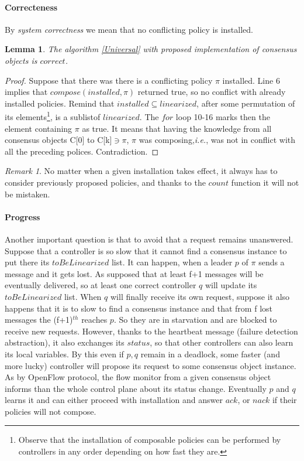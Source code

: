 \documentclass{article}
\newtheorem{lemma}{Lemma}
\theoremstyle{remark}
\newtheorem*{remark}{Remark}
\begin{document}
\paragraph{Correcteness} 
By \emph{system correctness} we mean that no conflicting policy is installed.
\begin{lemma}\label{Correctness}
The algorithm \ref{Universal} with proposed implementation of consensus objects is $correct$. 
\end{lemma}
\begin{proof}
Suppose that there was there is a conflicting policy $\pi$ installed.  Line 6 implies that $compose(installed,\pi)$ returned true, so no conflict with already installed policies.
Remind that $installed\subseteq linearized$, after some permutation of its elements\footnote{Observe that the installation of composable policies can be performed by controllers in any order depending on how fast they are.}, is a sublist\footnotemark of $linearized$. 
 The $for$ loop 10-16 marks then the element containing $\pi$ as true. It means that having the knowledge from all consensus objects C[0] to C[k]$\ni\pi$, $\pi$ was composing,\emph{i.e.}, was not in conflict with all the preceding polices. Contradiction.
\end{proof}
\begin{remark}
No matter when a given installation takes effect, it always has to consider previously proposed policies, and thanks to the $count$ function it will not be mistaken.
\end{remark}
\paragraph{Progress} Another important question is that to avoid that a request remains unanswered. Suppose that a controller is so slow that it cannot find a consensus instance to put there its $toBeLinearized$ list. It can happen, when a leader $p$ of $\pi$ sends a message and it gets lost. As supposed that at least f+1 messages will be eventually delivered, so at least one correct controller $q$ will update its $toBeLinearized$ list. When $q$ will finally receive its own request, suppose it also happens that it is to slow to find a consensus instance and that from f lost messages the (f+1)$^{th}$ reaches $p$. So they are in starvation and are blocked to receive new requests. However, thanks to the heartbeat message (failure detection abstraction), it also exchanges its $status$, so that other controllers can also learn its local variables. By this even if $p,q$ remain in a deadlock, some faster (and more lucky) controller will propose its request to some consensus object instance. As by OpenFlow protocol, the flow monitor from a given consensus object informs than the whole control plane about its status change. Eventually $p$ and $q$ learns it and can either proceed with installation and answer $ack$, or $nack$ if their policies will not compose.
\end{document}
